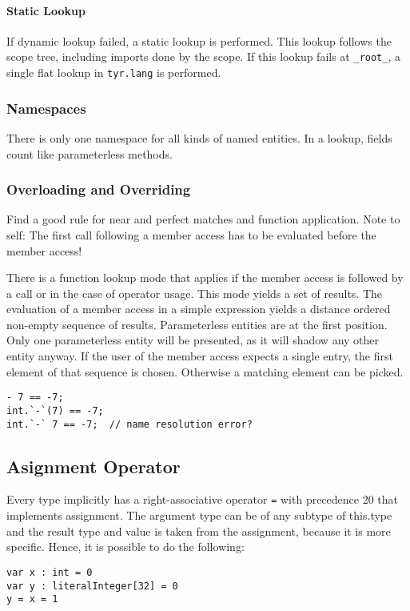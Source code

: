 \paragraph{Static Lookup} If dynamic lookup failed, a static lookup is performed.
This lookup follows the scope tree, including imports done by the scope.
If this lookup fails at \texttt{\_root\_}, a single flat lookup in \texttt{tyr.lang} is performed.


\subsubsection{Namespaces}

There is only one namespace for all kinds of named entities.
In a lookup, fields count like parameterless methods.


\subsubsection{Overloading and Overriding}

Find a good rule for near and perfect matches and function application.
Note to self: The first call following a member access has to be evaluated before the member access!

There is a function lookup mode that applies if the member access is followed by a call or in the case of operator usage.
This mode yields a set of results. 
The evaluation of a member access in a simple expression yields a distance ordered non-empty sequence of results.
Parameterless entities are at the first position.
Only one parameterless entity will be presented, as it will shadow any other entity anyway.
If the user of the member access expects a single entry, the first element of that sequence is chosen.
Otherwise a matching element can be picked.



\begin{lstlisting}[language=tyr]
- 7 == -7;
int.`-`(7) == -7;
int.`-` 7 == -7;  // name resolution error?
\end{lstlisting}

\subsection{Asignment Operator}

Every type implicitly has a right-associative operator \texttt{=} with precedence 20 that implements assignment.
The argument type can be of any subtype of this.type and the result type and value is taken from the assignment, because it is more specific.
Hence, it is possible to do the following:
\begin{lstlisting}[language=tyr]
var x : int = 0
var y : literalInteger[32] = 0
y = x = 1
\end{lstlisting}

